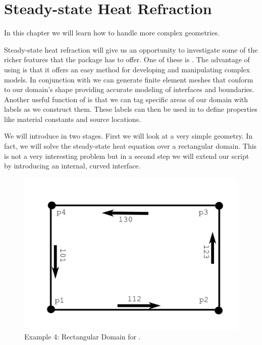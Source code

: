 
%
%
%

\section{Steady-state Heat Refraction}
\label{STEADY-STATE HEAT REFRACTION}

In this chapter we will learn how to handle more complex geometries. 

Steady-state heat refraction will give us an opportunity to investigate some of the richer features that the \esc package has to offer. One of these is \pycad . The advantage of using \pycad is that it offers an easy method for developing and manipulating complex models. In conjunction with \gmsh we can generate finite element meshes that conform to our domain's shape providing accurate modeling of interfaces and boundaries. Another useful function of \pycad is that we can tag specific areas of our domain with labels as we construct them. These labels can then be used in \esc to define properties like material constants and source locations. 

We will introduce in two stages. First we will look at a very simple geometry. In fact,  we will solve 
the steady-state heat equation over a rectangular domain. This is not a very interesting problem but in a second
step we will extend our script by introducing an internal, curved interface.

\begin{figure}[ht]
\centerline{\includegraphics[width=4.in]{figures/pycadrec}}
\caption{Example 4: Rectangular Domain for \pycad.}
\label{fig:pycad rec}
\end{figure}

